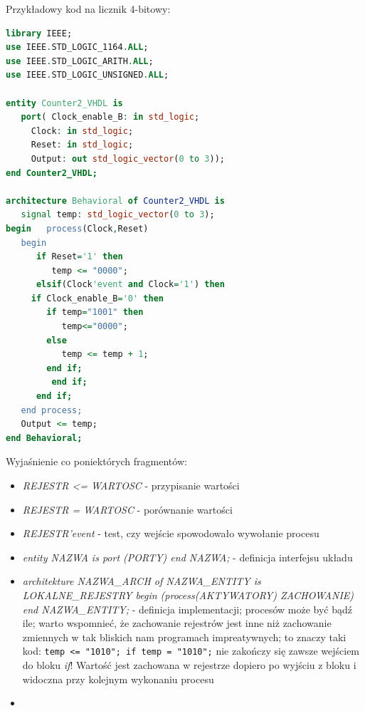 Przykładowy kod na licznik 4-bitowy:

\begin{lstlisting}[language=VHDL]
library IEEE;
use IEEE.STD_LOGIC_1164.ALL;
use IEEE.STD_LOGIC_ARITH.ALL;
use IEEE.STD_LOGIC_UNSIGNED.ALL;

entity Counter2_VHDL is
   port( Clock_enable_B: in std_logic;
 	 Clock: in std_logic;
 	 Reset: in std_logic;
 	 Output: out std_logic_vector(0 to 3));
end Counter2_VHDL;
 
architecture Behavioral of Counter2_VHDL is
   signal temp: std_logic_vector(0 to 3);
begin   process(Clock,Reset)
   begin
      if Reset='1' then
         temp <= "0000";
      elsif(Clock'event and Clock='1') then
 	 if Clock_enable_B='0' then
	    if temp="1001" then
	       temp<="0000";
	    else
	       temp <= temp + 1;
	    end if;
         end if;
      end if;
   end process;
   Output <= temp;
end Behavioral;
\end{lstlisting}

Wyjaśnienie co poniektórych fragmentów:
\begin{itemize}
\item \emph{REJESTR <= WARTOSC} - przypisanie wartości
\item \emph{REJESTR = WARTOSC} - porównanie wartości
\item \emph{REJESTR'event} - test, czy wejście spowodowało wywołanie procesu
\item \emph{entity NAZWA is port (PORTY) end NAZWA;} - definicja interfejsu układu
\item \emph{architekture NAZWA\_ARCH of NAZWA\_ENTITY is LOKALNE\_REJESTRY begin (process(AKTYWATORY) ZACHOWANIE) end NAZWA\_ENTITY;} - definicja implementacji; procesów może być bądź ile; warto wspomnieć, że zachowanie rejestrów jest inne niż zachowanie zmiennych w tak bliskich nam programach impreatywnych; to znaczy taki kod: \lstinline|temp <= "1010"; if temp = "1010";| nie zakończy się zawsze wejściem do bloku \emph{if}! Wartość jest zachowana w rejestrze dopiero po wyjściu z bloku i widoczna przy kolejnym wykonaniu procesu
\item 
\end{itemize}

